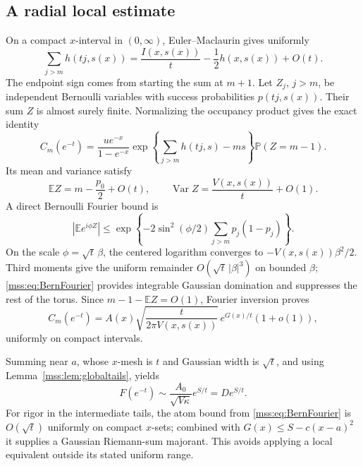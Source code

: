 \documentclass[11pt,letterpaper]{article}
\numberwithin{equation}{section}
\theoremstyle{definition}\newtheorem{definition}[theorem]{Definition}
\theoremstyle{remark}\newtheorem{remark}[theorem]{Remark}
\DeclareMathOperator{\Var}{Var}
\newcommand{\E}{\mathbb E}
\newcommand{\Prob}{\mathbb P}
\begin{document}
\subsection{A radial local estimate}
On a compact $x$-interval in $(0,\infty)$, Euler--Maclaurin gives uniformly
\begin{equation}\label{mss:eq:EMleading}
\sum_{j>m}h(tj,s(x))=\frac{I(x,s(x))}{t}-\frac12h(x,s(x))+O(t).
\end{equation}
The endpoint sign comes from starting the sum at $m+1$. Let $Z_j$, $j>m$, be independent Bernoulli variables with success probabilities $p(tj,s(x))$. Their sum $Z$ is almost surely finite. Normalizing the occupancy product gives the exact identity
\begin{equation}\label{mss:eq:radialprob}
C_m(e^{-t})=\frac{u e^{-x}}{1-e^{-x}}
\exp\left\{\sum_{j>m}h(tj,s)-ms\right\}\Prob(Z=m-1).
\end{equation}
Its mean and variance satisfy
\begin{equation}\label{mss:eq:Bernmoments}
\E Z=m-\frac{p_0}{2}+O(t),\qquad
\Var Z=\frac{V(x,s(x))}{t}+O(1).
\end{equation}
A direct Bernoulli Fourier bound is
\begin{equation}\label{mss:eq:BernFourier}
\left|\E e^{i\phi Z}\right|
\le\exp\left\{-2\sin^2(\phi/2)\sum_{j>m}p_j(1-p_j)\right\}.
\end{equation}
On the scale $\phi=\sqrt t\,\beta$, the centered logarithm converges to $-V(x,s(x))\beta^2/2$. Third moments give the uniform remainder $O(\sqrt t\,|\beta|^3)$ on bounded $\beta$; \eqref{mss:eq:BernFourier} provides integrable Gaussian domination and suppresses the rest of the torus. Since $m-1-\E Z=O(1)$, Fourier inversion proves
\begin{equation}\label{mss:eq:radiallocal}
C_m(e^{-t})=A(x)\sqrt{\frac{t}{2\pi V(x,s(x))}}
\,e^{G(x)/t}(1+o(1)),
\end{equation}
uniformly on compact intervals.

Summing near $a$, whose $x$-mesh is $t$ and Gaussian width is $\sqrt t$, and using Lemma~\ref{mss:lem:globaltails}, yields
\begin{equation}\label{mss:eq:radialleading}
F(e^{-t})\sim\frac{A_0}{\sqrt{V\kappa}}e^{S/t}=De^{S/t}.
\end{equation}
For rigor in the intermediate tails, the atom bound from \eqref{mss:eq:BernFourier} is $O(\sqrt t)$ uniformly on compact $x$-sets; combined with $G(x)\le S-c(x-a)^2$ it supplies a Gaussian Riemann-sum majorant. This avoids applying a local equivalent outside its stated uniform range.
\end{document}
